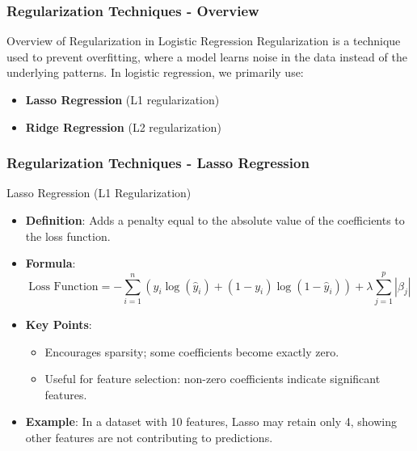 \documentclass[aspectratio=169]{beamer}
\begin{document}
\begin{frame}[fragile]
    \frametitle{Regularization Techniques - Overview}
    \begin{block}{Overview of Regularization in Logistic Regression}
        Regularization is a technique used to prevent overfitting, where a model learns noise in the data instead of the underlying patterns. 
        In logistic regression, we primarily use:
        \begin{itemize}
            \item \textbf{Lasso Regression} (L1 regularization)
            \item \textbf{Ridge Regression} (L2 regularization)
        \end{itemize}
    \end{block}
\end{frame}

\begin{frame}[fragile]
    \frametitle{Regularization Techniques - Lasso Regression}
    \begin{block}{Lasso Regression (L1 Regularization)}
        \begin{itemize}
            \item \textbf{Definition}: Adds a penalty equal to the absolute value of the coefficients to the loss function.
            \item \textbf{Formula}:
            \begin{equation}
                \text{Loss Function} = -\sum_{i=1}^{n} \left( y_i \log(\hat{y}_i) + (1 - y_i) \log(1 - \hat{y}_i) \right) + \lambda \sum_{j=1}^{p} | \beta_j |
            \end{equation}
            \item \textbf{Key Points}: 
                \begin{itemize}
                    \item Encourages sparsity; some coefficients become exactly zero.
                    \item Useful for feature selection: non-zero coefficients indicate significant features.
                \end{itemize}
            \item \textbf{Example}: In a dataset with 10 features, Lasso may retain only 4, showing other features are not contributing to predictions.
        \end{itemize}
    \end{block}
\end{frame}
\end{document}
